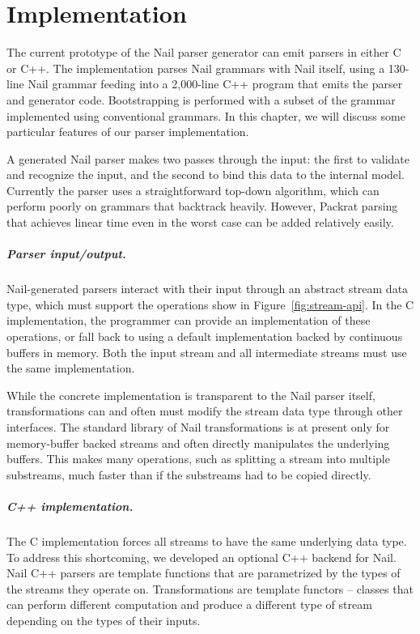 \chapter{Implementation}
\label{s:impl}

The current prototype of the Nail parser generator can emit parsers in either C or C++. The implementation parses Nail grammars with Nail itself, using a
130-line Nail grammar feeding into a 2,000-line C++ program that
emits the parser and generator code. Bootstrapping is
performed with a subset of the grammar implemented using conventional grammars. 
In this chapter, we will discuss some particular features of our parser
implementation.


A generated Nail parser makes two passes through the input: the first to
validate and recognize the input, and the second to bind this data to the internal
model. Currently the parser uses a straightforward top-down algorithm, which can perform poorly on
grammars that backtrack heavily. However, Packrat
parsing~\cite{packrat-parsing:icfp02} that achieves linear time even in the worst case can be added relatively easily.

\paragraph{Parser input/output.}
Nail-generated parsers interact with their input through an abstract stream data type, which must support the operations show in Figure~\ref{fig:stream-api}. In the C implementation, the programmer can provide an implementation of these operations, or fall back to using a default implementation backed by continuous buffers in memory. Both the input stream and all intermediate streams must use the same implementation.

While the concrete implementation is transparent to the Nail parser itself, transformations can and often must modify the stream data type through other interfaces. The standard library of Nail transformations is at present only for memory-buffer backed streams and often directly manipulates the underlying buffers. This makes many operations, such as splitting a stream into multiple substreams, much faster than if the substreams had to be copied directly. 


\paragraph{C++ implementation.}
The C implementation forces all streams to have the same underlying data type. To address this shortcoming, we developed an optional C++ backend for Nail. Nail C++ parsers are template functions that are parametrized by the types of the streams they operate on. Transformations are template functors -- classes that can perform different computation  and produce a different type of stream depending on the types of their inputs.


